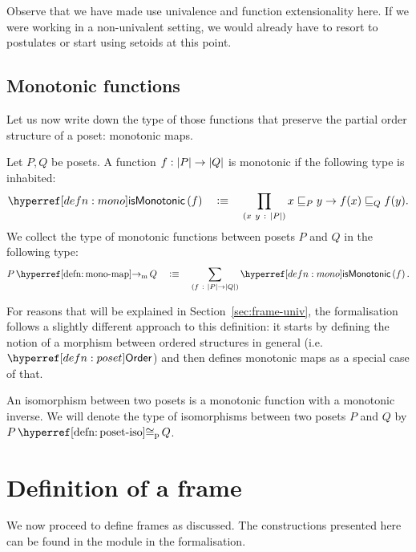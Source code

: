 Observe that we have made use univalence and function extensionality here. If we were
working in a non-univalent setting, we would already have to resort to postulates or start
using setoids at this point.

\subsection{Monotonic functions}

Let us now write down the type of those functions that preserve the partial order
structure of a poset: monotonic maps.

\begin{defn}\label{defn:mono-map}
  Let $P, Q$ be posets. A function $f : \left| P \right| \rightarrow \left| Q \right|$ is monotonic if the following
  type is inhabited:
  \begin{equation*}
    \ismonotonic{f} \quad\is\quad \pity{x~y}{\abs{P}}{x \sqsubseteq_P y \rightarrow f(x) \sqsubseteq_Q f(y)}.
  \end{equation*}
  We collect the type of monotonic functions between posets $P$ and $Q$ in the following
  type:
  \begin{equation*}
    \mono{P}{Q} \quad\is\quad \sigmaty{f}{\abs{P} \rightarrow \abs{Q}}{\ismonotonic{f}}.
  \end{equation*}
\end{defn}

For reasons that will be explained in Section~\ref{sec:frame-univ}, the \veragda{}
formalisation follows a slightly different approach to this definition: it starts by
defining the notion of a morphism between ordered structures in general
(i.e.~$\ordernm{}$) and then defines monotonic maps as a special case of that.

\begin{defn}\label{defn:poset-iso}
  An isomorphism between two posets is a monotonic function with a monotonic inverse.
  We will denote the type of isomorphisms between two posets $P$ and $Q$ by
  $\posetiso{P}{Q}$.
\end{defn}

\section{Definition of a frame}\label{sec:frame}

We now proceed to define frames as discussed. The constructions presented here can be
found in the  module in the \veragda{} formalisation.

